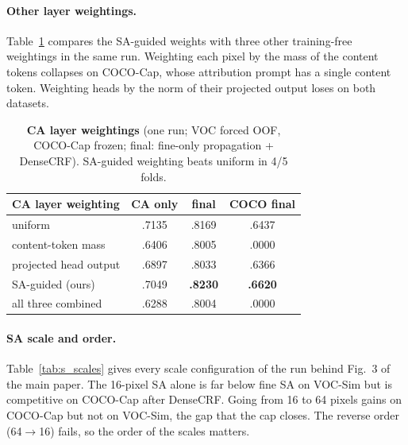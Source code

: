 \documentclass[10pt,twocolumn,letterpaper]{article}
\begin{document}
\paragraph{Other layer weightings.}
Table~\ref{tab:s_weighting} compares the SA-guided weights with three other training-free weightings in the same run. Weighting each pixel by the mass of the content tokens collapses on COCO-Cap, whose attribution prompt has a single content token. Weighting heads by the norm of their projected output loses on both datasets.

\begin{table}[t]
\centering
\footnotesize\setlength{\tabcolsep}{3pt}
\begin{tabular}{@{}lccc@{}}
\toprule
CA layer weighting & CA only & final & COCO final \\
\midrule
uniform & .7135 & .8169 & .6437 \\
content-token mass & .6406 & .8005 & .0000 \\
projected head output & .6897 & .8033 & .6366 \\
SA-guided (ours) & .7049 & \textbf{.8230} & \textbf{.6620} \\
all three combined & .6288 & .8004 & .0000 \\
\bottomrule
\end{tabular}
\caption{\textbf{CA layer weightings} (one run; VOC forced OOF, COCO-Cap frozen; final: fine-only propagation + DenseCRF). SA-guided weighting beats uniform in 4/5 folds.}
\label{tab:s_weighting}
\end{table}

\paragraph{SA scale and order.}
Table~\ref{tab:s_scales} gives every scale configuration of the run behind Fig.~3 of the main paper. The 16-pixel SA alone is far below fine SA on VOC-Sim but is competitive on COCO-Cap after DenseCRF. Going from 16 to 64 pixels gains on COCO-Cap but not on VOC-Sim, the gap that the cap closes. The reverse order (64$\rightarrow$16) fails, so the order of the scales matters.
\end{document}

